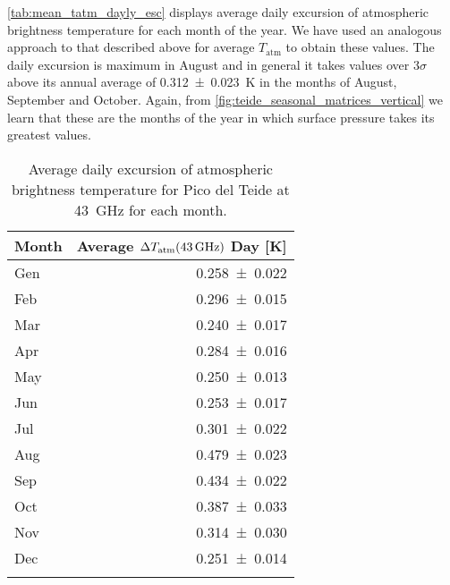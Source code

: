 \autoref{tab:mean_tatm_dayly_esc} displays average daily excursion of
atmospheric brightness temperature for each month of the year. We have used
an analogous approach to that described above for average $T_\text{atm}$ to
obtain these values. The daily excursion is maximum in August and in
general it takes values over $3\sigma$ above its annual average of
\SI{0.312 \pm 0.023}{\kelvin} in the months of August, September and
October. Again, from \autoref{fig:teide_seasonal_matrices_vertical} we
learn that these are the months of the year in which surface pressure
takes its greatest values.

\begin{table}
        \renewcommand{\arraystretch}{1.5}
        \centering
        \begin{tabular}{p{5cm} r}
                \hline
                Month & Average $\Delta
                T_\text{atm}\qty(\SI{43}{\giga\hertz})$
                Day [\si{\kelvin}] \\
                \hline
                \hline
                Gen \dotfill & \num{0.258 \pm 0.022} \\
                Feb \dotfill & \num{0.296 \pm 0.015} \\
                Mar \dotfill & \num{0.240 \pm 0.017} \\
                Apr \dotfill & \num{0.284 \pm 0.016} \\
                May \dotfill & \num{0.250 \pm 0.013} \\
                Jun \dotfill & \num{0.253 \pm 0.017} \\
                Jul \dotfill & \num{0.301 \pm 0.022} \\
                Aug \dotfill & \num{0.479 \pm 0.023} \\
                Sep \dotfill & \num{0.434 \pm 0.022} \\
                Oct \dotfill & \num{0.387 \pm 0.033} \\
                Nov \dotfill & \num{0.314 \pm 0.030} \\
                Dec \dotfill & \num{0.251 \pm 0.014} \\
                \noalign{\smallskip}
                \hline
        \end{tabular}
        \caption{Average daily excursion of atmospheric brightness
        temperature for Pico del Teide at \SI{43}{\giga\hertz} for each
        month.}
        \label{tab:mean_tatm_dayly_esc}
\end{table}

